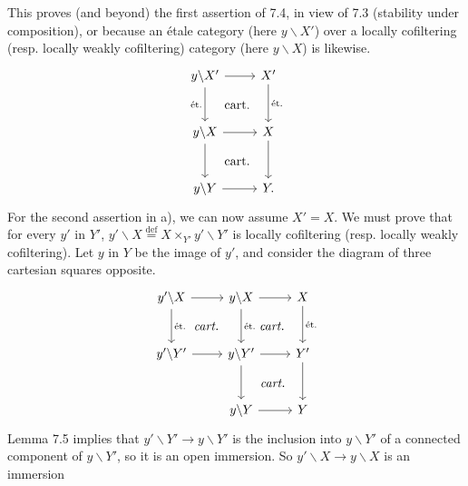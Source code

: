 This proves (and beyond) the first assertion of 7.4, in view of 7.3 (stability under composition), or because an  étale category (here $y\backslash X'$) over a locally cofiltering (resp. locally weakly cofiltering) category (here $y\backslash X$) is likewise.
\[
\begin{tikzcd}[row sep=large]
y\backslash X' \arrow[r] \arrow[d, "\text{ét.}"'] \arrow[dr, phantom, "\text{cart.}"] & X' \arrow[d, "\text{ét.}"] \\
y\backslash X \arrow[r] \arrow[d] \arrow[dr, phantom, "\text{cart.}"] & X \arrow[d] \\
y\backslash Y \arrow[r] & Y.
\end{tikzcd}
\]
For the second assertion in a), we can now assume $X' = X$. We must prove that for every $y'$ in $Y'$, $y'\backslash X \overset{\text{def}}{=} X \times_{Y'} y'\backslash Y'$ is locally cofiltering (resp. locally weakly cofiltering). Let $y$ in $Y$ be the image of $y'$, and consider the diagram of three cartesian squares opposite.
\[
\begin{tikzcd}[row sep=large]
y'\backslash X \arrow[r] \arrow[d, "\text{ét.}"] \arrow[dr, phantom, "\textit{cart.}"] & y\backslash X \arrow[r] \arrow[d, "\text{ét.}"] \arrow[dr, phantom, "\textit{cart.}"] & X \arrow[d, "\text{ét.}"] \\
y'\backslash Y' \arrow[r] & y\backslash Y' \arrow[r] \arrow[d] \arrow[dr, phantom, "\textit{cart.}"] & Y' \arrow[d] \\
 & y\backslash Y \arrow[r] & Y
\end{tikzcd}
\]
Lemma 7.5 implies that $y'\backslash Y' \longrightarrow y\backslash Y'$ is the inclusion into $y\backslash Y'$ of a connected component of $y\backslash Y'$, so it is an open immersion. So $y'\backslash X \longrightarrow y\backslash X$ is an immersion
